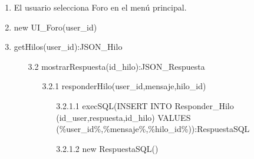 ﻿\documentclass{report}
\begin{document}
            \begin{enumerate}
                \item El usuario selecciona Foro en el menú principal.
                \item new UI\_Foro(user\_id)
                \item getHilos(user\_id):JSON\_Hilo
                \begin{enumerate}
                    \item [3.2] mostrarRespuesta(id\_hilo):JSON\_Respuesta
                    \begin{enumerate}
                        \item [3.2.1] responderHilo(user\_id,mensaje,hilo\_id)
                        \begin{enumerate}
                            \item[3.2.1.1] execSQL(INSERT INTO Responder\_Hilo (id\_user,respuesta,id\_hilo) VALUES (\%user\_id\%,\%mensaje\%,\%hilo\_id\%)):RespuestaSQL
                            \item [3.2.1.2]new RespuestaSQL()
                        \end{enumerate}
                    \end{enumerate}
                \end{enumerate}
            \end{enumerate}
            \clearpage
\end{document}
